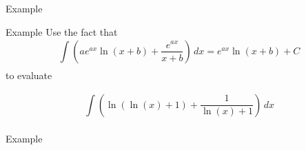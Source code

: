 \documentclass[presentation]{beamer}
\begin{document}
\begin{frame}[label={sec:org6482b38}]{Example}
\end{frame}

\begin{frame}[label={sec:orgbb84b7b}]{Example}
Use the fact that
\[ \int\limits_{}^{} \left( ae^{ax}\ln \left( x + b
\right) + \frac{e^{ax}}{x+b} \right)\,dx = e^{ax}\ln \left( x+b
\right)+C\]
to evaluate

\[ \int\limits_{}^{} \left( \ln \left( \ln(x) + 1 \right) +
\frac{1}{\ln(x)+1} \right)\,dx\]
\vspace{10in}
\end{frame}

\begin{frame}[label={sec:orgf9b6056}]{Example}
\end{frame}
\end{document}
